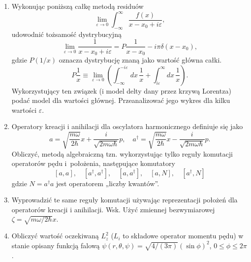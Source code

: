 \documentclass[a4paper,11pt]{article}
\begin{document}
\begin{enumerate}
\item Wykonując poniższą całkę metodą residuów
  \begin{equation}
    \label{QM:27}
    \lim_{ \varepsilon \to 0 } \int_{ -\infty }^{ \infty } \frac{ f( x ) }{ x - x_{ 0 } + i \varepsilon },
  \end{equation}
  udowodnić tożsamość dystrybucyjną
  \begin{equation}
    \label{QM:28}
    \lim_{ \varepsilon \to 0 } \frac{ 1 }{ x - x_{ 0 } + i \varepsilon } =
    P \frac{ 1 }{ x - x_{ 0 } } - i \pi \delta( x - x_{ 0 } ),
  \end{equation}
  gdzie $P( 1 / x )$ oznacza dystrybucję znaną jako wartość główna
  całki.
  \begin{equation}
    \label{QM:29}
    P \frac{ 1 }{ x } \equiv
    \lim_{ \varepsilon \to 0 } \left( \int_{ -\infty }^{ -i \varepsilon } dx \, \frac{ 1 }{ x }
      + \int_{ i \varepsilon }^{ \infty } dx \, \frac{ 1 }{ x } \right).
  \end{equation}
  Wykorzystujący ten związek (i model delty dany przez krzywą
  Lorentza) podać model dla wartości głównej. Przeanalizować jego
  wykres dla kilku wartości $\varepsilon$.

\item Operatory kreacji i anihilacji dla oscylatora harmonicznego
  definiuje się jako
  \begin{equation}
    \label{QM:30}
    a =
    \sqrt{ \frac{ m \omega }{ 2 \hbar } } x
    + \frac{ i }{ \sqrt{ 2 m \omega \hbar } } p, \quad
    a^{ \dagger } =
    \sqrt{ \frac{ m \omega }{ 2 \hbar } } x
    - \frac{ i }{ \sqrt{ 2 m \omega \hbar } } p.
  \end{equation}
  Obliczyć, metodą algebraiczną tzn. wykorzystując tylko reguły
  komutacji operatorów pędu i~położenia, następujące komutatory
  \begin{equation}
    \label{QM:31}
    [ a, a ], \quad [ a^{ \dagger }, a^{ \dagger } ], \quad [ a, a^{ \dagger } ], \quad
    [ a, N ], \quad [ a^{ \dagger }, N ]
  \end{equation}
  gdzie $N = a^{ \dagger } a$ jest operatorem „liczby kwantów”.

\item Wyprowadzić te same reguły komutacji używając reprezentacji
  położeń dla operatorów kreacji i anihilacji. Wsk. Użyć zmiennej
  bezwymiarowej $\zeta = \sqrt{ m \omega / 2 \hbar } x$.

\item Obliczyć wartość oczekiwaną $L_{ z }^{ 2 }$ ($L_{ i }$ to
  składowe operator momentu pędu) w stanie opisany funkcją falową
  $\psi( r, \theta, \psi ) = \sqrt{ 4 / ( 3 \pi ) } ( \sin \phi )^{ 2
  }$, $0 \leq \phi \leq 2\pi$.


\end{enumerate}
\end{document}
